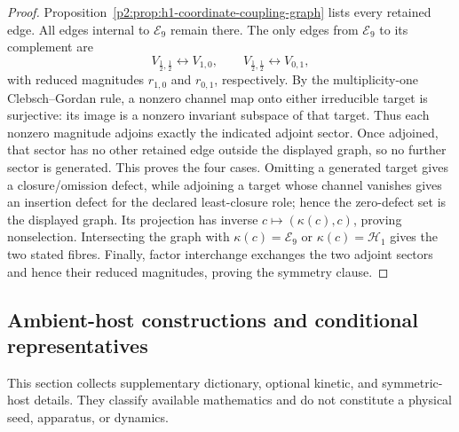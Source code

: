 \documentclass[11pt,a4paper]{article}
\begin{document}
\begin{proof}
Proposition~\ref{p2:prop:h1-coordinate-coupling-graph} lists every retained
edge.  All edges internal to \(\mathcal E_9\) remain there.  The only edges
from \(\mathcal E_9\) to its complement are
\[
V_{\frac12,\frac12}\longleftrightarrow V_{1,0},
\qquad
V_{\frac12,\frac12}\longleftrightarrow V_{0,1},
\]
with reduced magnitudes \(r_{1,0}\) and \(r_{0,1}\), respectively.  By the
multiplicity-one Clebsch--Gordan rule, a nonzero channel map onto either
irreducible target is surjective: its image is a nonzero invariant subspace
of that target.  Thus each nonzero magnitude adjoins exactly the indicated
adjoint sector.  Once adjoined, that sector has no other retained edge outside
the displayed graph, so no further sector is generated.  This proves the
four cases.  Omitting a generated target gives a closure/omission defect,
while adjoining a target whose channel vanishes gives an insertion defect for
the declared least-closure role; hence the zero-defect set is the displayed
graph.  Its projection has inverse \(c\mapsto(\kappa(c),c)\), proving
nonselection.  Intersecting the graph with
\(\kappa(c)=\mathcal E_9\) or \(\kappa(c)=\mathcal H_1\) gives the two stated
fibres.  Finally, factor interchange exchanges the two adjoint sectors and
hence their reduced magnitudes, proving the symmetry clause.
\end{proof}




\subsection{Ambient-host constructions and conditional representatives}
\label{p2c:app:deferred-host-infrastructure}
This section collects supplementary dictionary, optional kinetic, and
symmetric-host details.  They classify available mathematics and do not
constitute a physical seed, apparatus, or dynamics.
\end{document}
